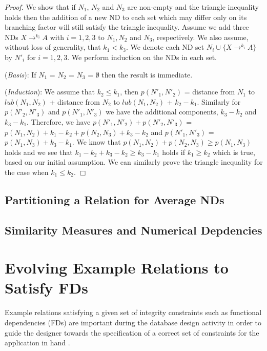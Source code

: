 {\em Proof.} We show that if $N_1$, $N_2$ and $N_3$ are non-empty and the 
triangle
inequality holds then the addition of a new ND to each set which may
differ only on its branching factor will still satisfy the triangle inequality.
Assume we add three NDs $X \to^{k_i} A$ with $i = 1,2,3$ to $N_1,N_2$ and
$N_3$, respectively. We also assume, without loss of generality, that 
$k_1 < k_3$. We denote each ND set $N_i \cup \{ X \to^{k_i} A \}$ by $N'_i$
for $i = 1,2,3$. We perform induction on the NDs in each set.

\smallskip
({\em Basis}): If $N_1$ = $N_2$ = $N_3$ = $\emptyset$ then the 
result is immediate.

\smallskip
({\em Induction}):
 We assume that $k_2 \le k_1$, then $p(N'_1,N'_2)$ =
distance from $N_1$ to $lub(N_1,N_2)$ + distance from $N_2$ to $lub(N_1,N_2)$ +
$k_2 - k_1$. Similarly for $p(N'_2,N'_3)$ and $p(N'_1,N'_3)$ we have the
additional components, $k_3 - k_2$ and $k_3 - k_1$. Therefore, we have
$p(N'_1,N'_2) + p(N'_2,N'_3)$ = $p(N_1,N_2) + k_1 - k_2 + p(N_2,N_3) +
k_3 - k_2$ and $p(N'_1,N'_3)$ = $p(N_1,N_3) + k_3 - k_1$. We know that  
$p(N_1,N_2) + p(N_2,N_3) \ge p(N_1,N_3)$ holds and we see
 that  $k_1 - k_2 + k_3 - k_2 \ge k_3 - k_1$ holds if $k_1 \ge k_2$ which
is true, based on our initial assumption. We can similarly prove the 
triangle inequality for the case when $k_1 \le k_2$. $\Box$



\subsection{Partitioning a Relation for Average NDs}

\subsection{Similarity Measures and Numerical Depdencies}


\section{Evolving Example Relations to Satisfy FDs}



Example relations satisfying a given set of integrity constraints such as 
functional dependencies (FDs) are important during the database design 
activity in order to guide the designer towards the specification of a correct 
set of constraints for the application in hand \cite{sm81}. 

